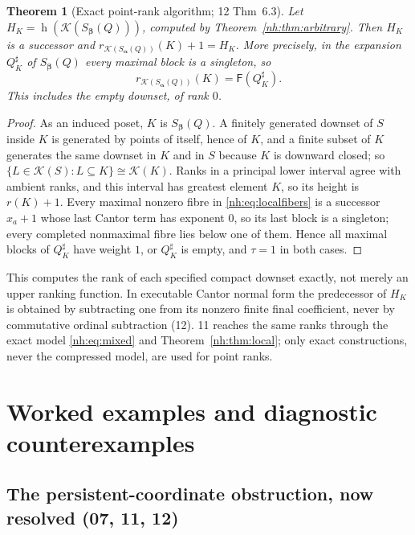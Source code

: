 \documentclass[11pt,a4paper]{article}
\newtheorem{theorem}{Theorem}[section]
\theoremstyle{definition}
\theoremstyle{remark}
\newcommand{\K}{\mathcal K}
\newcommand{\hgt}{\operatorname{h}}
\newcommand{\Fdp}{\mathsf F}
\begin{document}
\begin{theorem}[Exact point-rank algorithm; 12 Thm~6.3]\label{nh:thm:localrank}
Let $H_K=\hgt(\K(S_{\boldsymbol\beta}(Q)))$, computed by
Theorem~\ref{nh:thm:arbitrary}. Then $H_K$ is a successor and
$r_{\K(S_{\boldsymbol\alpha}(Q))}(K)+1=H_K$. More precisely, in the expansion
$Q^\sharp_K$ of $S_{\boldsymbol\beta}(Q)$ every maximal block is a singleton, so
\[
 \boxed{r_{\K(S_{\boldsymbol\alpha}(Q))}(K)=\Fdp(Q^\sharp_K).}
\]
This includes the empty downset, of rank $0$.
\end{theorem}
\begin{proof}
As an induced poset, $K$ is $S_{\boldsymbol\beta}(Q)$. A finitely generated
downset of $S$ inside $K$ is generated by points of itself, hence of $K$, and a
finite subset of $K$ generates the same downset in $K$ and in $S$ because $K$ is
downward closed; so $\{L\in\K(S):L\subseteq K\}\cong\K(K)$. Ranks in a principal
lower interval agree with ambient ranks, and this interval has greatest element
$K$, so its height is $r(K)+1$. Every maximal nonzero fibre in
\eqref{nh:eq:localfibers} is a successor $x_a+1$ whose last Cantor term has
exponent $0$, so its last block is a singleton; every completed nonmaximal fibre
lies below one of them. Hence all maximal blocks of $Q^\sharp_K$ have weight $1$,
or $Q^\sharp_K$ is empty, and $\tau=1$ in both cases.
\end{proof}

This computes the rank of each specified compact downset exactly, not merely an
upper ranking function. In executable Cantor normal form the predecessor of
$H_K$ is obtained by subtracting one from its nonzero finite final coefficient,
never by commutative ordinal subtraction (12). 11 reaches the same ranks through
the exact model \eqref{nh:eq:mixed} and Theorem~\ref{nh:thm:local}; only exact
constructions, never the compressed model, are used for point ranks.
\section{Worked examples and diagnostic counterexamples}\label{nh:sec:examples}

\subsection{The persistent-coordinate obstruction, now resolved (07, 11, 12)}
\end{document}
